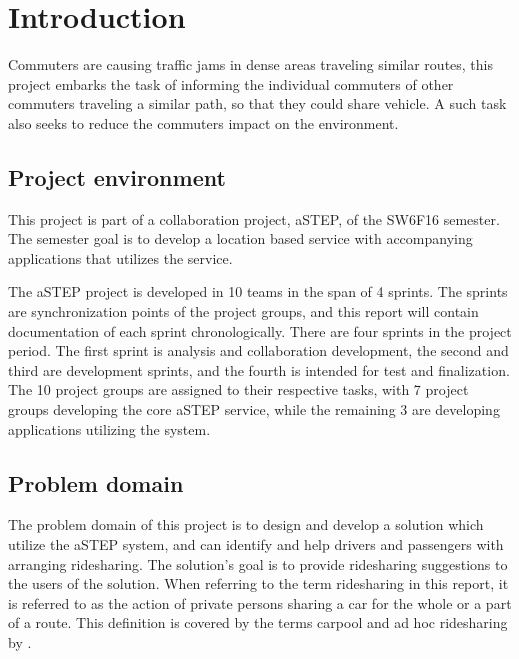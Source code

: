 \chapter{Introduction}\label{ch:introduction}


Commuters are causing traffic jams in dense areas traveling similar routes, this project embarks the task of informing the individual commuters of other commuters traveling a similar path, so that they could share vehicle.
A such task also seeks to reduce the commuters impact on the environment.


\section{Project environment}
This project is part of a collaboration project, aSTEP, of the SW6F16 semester.
The semester goal is to develop a location based service with accompanying applications that utilizes the service. 

The aSTEP project is developed in 10 teams in the span of 4 sprints.
The sprints are synchronization points of the project groups, and this report will contain documentation of each sprint chronologically.
There are four sprints in the project period.
The first sprint is analysis and collaboration development, the second and third are development sprints, and the fourth is intended for test and finalization.
The 10 project groups are assigned to their respective tasks, with 7 project groups developing the core aSTEP service, while the remaining 3 are developing applications utilizing the system.



\section{Problem domain}
The problem domain of this project is to design and develop a solution which utilize the aSTEP system, and can identify and help drivers and passengers with arranging ridesharing.
The solution's goal is to provide ridesharing suggestions to the users of the solution.
When referring to the term ridesharing in this report, it is referred to as the action of private persons sharing a car for the whole or a part of a route. 
This definition is covered by the terms carpool and ad hoc ridesharing by \citet{doi:10.1080/01441647.2011.621557}.  

